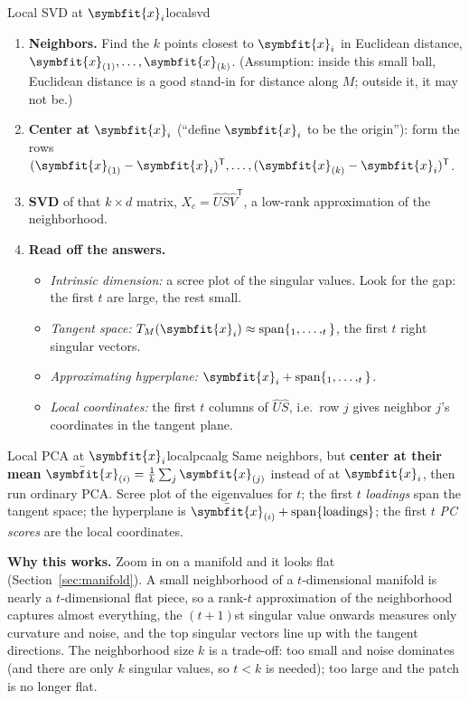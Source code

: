 \documentclass[11pt]{article}
\newcommand{\bm}[1]{\symbfit{#1}}
\newcommand{\vx}{\bm{x}}
\let\vv\relax\newcommand{\vv}{\bm{v}}
\newcommand{\T}{^{\mathsf T}}
\newcommand{\spn}{\operatorname{span}}
\begin{document}
\begin{algorithm}{Local SVD at $\vx_i$}{localsvd}
\begin{enumerate}[nosep,label=\arabic*)]
\item \textbf{Neighbors.} Find the $k$ points closest to $\vx_i$ in Euclidean distance, $\vx_{(1)},\dots,\vx_{(k)}$. (Assumption: inside this
small ball, Euclidean distance is a good stand-in for distance along $M$; outside it, it may not be.)
\item \textbf{Center at $\vx_i$} (``define $\vx_i$ to be the origin''): form the rows $(\vx_{(1)}-\vx_i)\T,\dots,(\vx_{(k)}-\vx_i)\T$.
\item \textbf{SVD} of that $k\times d$ matrix, $X_c=\widehat U\widehat S\widehat V\T$, a low-rank approximation of the neighborhood.
\item \textbf{Read off the answers.}
\begin{itemize}[nosep]
\item \emph{Intrinsic dimension:} a scree plot of the singular values. Look for the gap: the first $t$ are large, the rest small.
\item \emph{Tangent space:} $T_M(\vx_i)\approx\spn\{\vv_1,\dots,\vv_t\}$, the first $t$ right singular vectors.
\item \emph{Approximating hyperplane:} $\vx_i+\spn\{\vv_1,\dots,\vv_t\}$.
\item \emph{Local coordinates:} the first $t$ columns of $\widehat U\widehat S$, i.e.\ row $j$ gives neighbor $j$'s coordinates in the tangent plane.
\end{itemize}
\end{enumerate}
\end{algorithm}

\begin{algorithm}{Local PCA at $\vx_i$}{localpcaalg}
Same neighbors, but \textbf{center at their mean} $\bar{\vx}_{(i)}=\tfrac1k\sum_j\vx_{(j)}$ instead of at $\vx_i$, then run ordinary PCA. Scree plot of the
eigenvalues for $t$; the first $t$ \emph{loadings} span the tangent space; the hyperplane is $\bar{\vx}_{(i)}+\spn\{\text{loadings}\}$; the first $t$ \emph{PC scores}
are the local coordinates.
\end{algorithm}

\begin{intuition}
\textbf{Why this works.} Zoom in on a manifold and it looks flat (Section~\ref{sec:manifold}). A small neighborhood of a
$t$-dimensional manifold is nearly a $t$-dimensional flat piece, so a rank-$t$ approximation of the neighborhood captures
almost everything, the $(t+1)$st singular value onwards measures only curvature and noise, and the top singular
vectors line up with the tangent directions. The neighborhood size $k$ is a trade-off: too small and noise dominates
(and there are only $k$ singular values, so $t<k$ is needed); too large and the patch is no longer flat.
\end{intuition}
\end{document}
